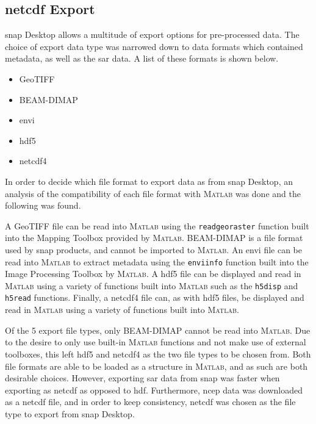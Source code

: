 

\subsection{\acs{netcdf} Export} \label{subsec:systemDesign.preProcessing.exportNetCDF}
\acs{snap} Desktop allows a multitude of export options for pre-processed data. The choice of export data type was narrowed down to data formats which contained metadata, as well as the \acs{sar} data. A list of these formats is shown below.

\begin{itemize}
    \item GeoTIFF
    \item BEAM-DIMAP
    \item \ac{envi}
    \item \ac{hdf}5
    \item \ac{netcdf}4
\end{itemize}

In order to decide which file format to export data as from \acs{snap} Desktop, an analysis of the compatibility of each file format with \textsc{Matlab} was done and the following was found.

A GeoTIFF file can be read into \textsc{Matlab} using the \lstinline{readgeoraster} function built into the Mapping Toolbox provided by \textsc{Matlab}. BEAM-DIMAP is a file format used by \acs{snap} products, and cannot be imported to \textsc{Matlab}. An \ac{envi} file can be read into \textsc{Matlab} to extract metadata using the \lstinline{enviinfo} function built into the Image Processing Toolbox by \textsc{Matlab}. A \acs{hdf}5 file can be displayed and read in \textsc{Matlab} using a variety of functions built into \textsc{Matlab} such as the \lstinline{h5disp} and \lstinline{h5read} functions. Finally, a \acs{netcdf}4 file can, as with \acs{hdf}5 files, be displayed and read in \textsc{Matlab} using a variety of functions built into \textsc{Matlab}.

Of the 5 export file types, only BEAM-DIMAP cannot be read into \textsc{Matlab}. Due to the desire to only use built-in \textsc{Matlab} functions and not make use of external toolboxes, this left \acs{hdf}5 and \acs{netcdf}4 as the two file types to be chosen from. Both file formats are able to be loaded as a structure in \textsc{Matlab}, and as such are both desirable choices. However, exporting \acs{sar} data from \acs{snap} was faster when exporting as \acs{netcdf} as opposed to \acs{hdf}. Furthermore, \acs{ncep} data was downloaded as a \acs{netcdf} file, and in order to keep consistency, \acs{netcdf} was chosen as the file type to export from \acs{snap} Desktop.

